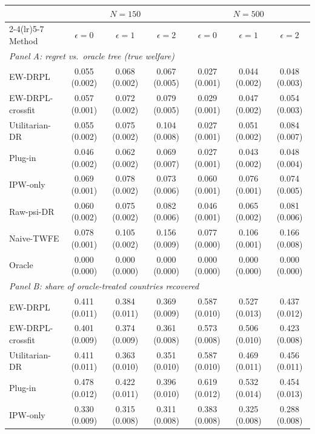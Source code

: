 \begin{tabular}{lcccccc}
\toprule
 & \multicolumn{3}{c}{$N=150$} & \multicolumn{3}{c}{$N=500$} \\
\cmidrule(lr){2-4}\cmidrule(lr){5-7}
Method & $\epsilon=0$ & $\epsilon=1$ & $\epsilon=2$ & $\epsilon=0$ & $\epsilon=1$ & $\epsilon=2$ \\
\midrule
\multicolumn{7}{l}{\emph{Panel A: regret vs.\ oracle tree (true welfare)}} \\
EW-DRPL & 0.055 (0.002) & 0.068 (0.002) & 0.067 (0.005) & 0.027 (0.001) & 0.044 (0.002) & 0.048 (0.003) \\
EW-DRPL-crossfit & 0.057 (0.001) & 0.072 (0.002) & 0.079 (0.005) & 0.029 (0.001) & 0.047 (0.002) & 0.054 (0.003) \\
Utilitarian-DR & 0.055 (0.002) & 0.075 (0.002) & 0.104 (0.008) & 0.027 (0.001) & 0.051 (0.002) & 0.084 (0.007) \\
Plug-in & 0.046 (0.002) & 0.062 (0.002) & 0.069 (0.007) & 0.027 (0.001) & 0.043 (0.002) & 0.048 (0.004) \\
IPW-only & 0.069 (0.001) & 0.078 (0.002) & 0.073 (0.006) & 0.060 (0.001) & 0.076 (0.001) & 0.074 (0.005) \\
Raw-psi-DR & 0.060 (0.002) & 0.075 (0.002) & 0.082 (0.006) & 0.046 (0.001) & 0.065 (0.002) & 0.081 (0.006) \\
Naive-TWFE & 0.078 (0.001) & 0.105 (0.002) & 0.156 (0.009) & 0.077 (0.000) & 0.106 (0.001) & 0.166 (0.008) \\
Oracle & 0.000 (0.000) & 0.000 (0.000) & 0.000 (0.000) & 0.000 (0.000) & 0.000 (0.000) & 0.000 (0.000) \\
\midrule
\multicolumn{7}{l}{\emph{Panel B: share of oracle-treated countries recovered}} \\
EW-DRPL & 0.411 (0.011) & 0.384 (0.011) & 0.369 (0.009) & 0.587 (0.010) & 0.527 (0.013) & 0.437 (0.012) \\
EW-DRPL-crossfit & 0.401 (0.009) & 0.374 (0.009) & 0.361 (0.008) & 0.573 (0.008) & 0.506 (0.010) & 0.423 (0.008) \\
Utilitarian-DR & 0.411 (0.011) & 0.363 (0.010) & 0.351 (0.010) & 0.587 (0.010) & 0.469 (0.011) & 0.456 (0.011) \\
Plug-in & 0.478 (0.012) & 0.422 (0.011) & 0.396 (0.010) & 0.619 (0.012) & 0.532 (0.014) & 0.454 (0.013) \\
IPW-only & 0.330 (0.009) & 0.315 (0.008) & 0.311 (0.008) & 0.383 (0.008) & 0.325 (0.008) & 0.288 (0.008) \\

\end{tabular}
